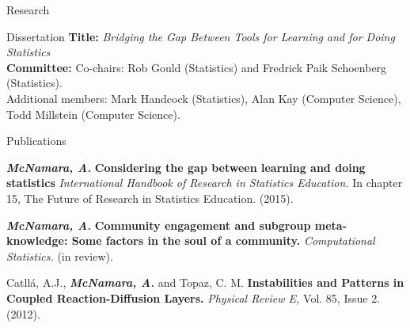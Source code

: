 \documentclass{resume} %
\begin{document}
\begin{rSection}{Research}
%
%
\end{rSection}

\clearpage


\begin{rSection}{Dissertation}
{\bf Title:} {\em Bridging the Gap Between Tools for Learning and for Doing Statistics} 
\\{\bf Committee:} Co-chairs: Rob Gould (Statistics) and Fredrick Paik Schoenberg (Statistics).
\\ Additional members: Mark Handcock (Statistics), Alan Kay (Computer Science), Todd Millstein (Computer Science).
\end{rSection}



\begin{rSection}{Publications}


{\bf \em McNamara, A.} {\bf Considering the gap between learning and doing statistics} {\em International Handbook of Research in Statistics Education.} In chapter 15, The Future of Research in Statistics Education. {(2015).}

{\bf \em McNamara, A.} {\bf Community engagement and subgroup meta-knowledge: Some factors in the soul of a community.} { \em Computational Statistics.} (in review).





{Catll{\'a}, A.J., {\bf \em McNamara, A.} and Topaz, C. M.} {\bf Instabilities and Patterns in Coupled Reaction-Diffusion Layers.} {\em Physical Review E,} Vol. 85, Issue 2. (2012). 

\end{rSection}
\end{document}
